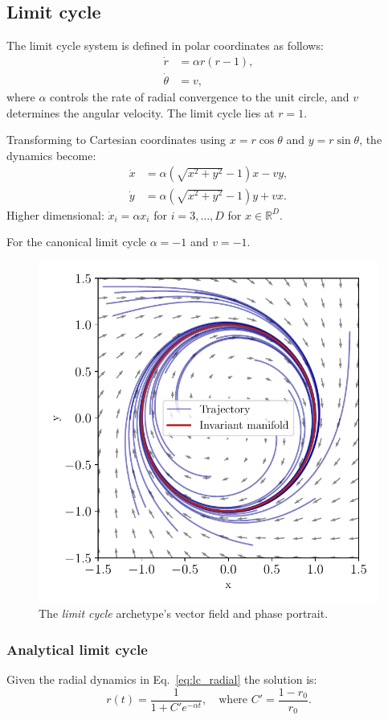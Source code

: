\documentclass{article}
\theoremstyle{definition} \newtheorem{definition}{Definition}  \newtheorem{example}{Example}
\theoremstyle{remark} \newtheorem{remark}{Remark}
\newcounter{ct}
\newcommand{\field}[1]{\ensuremath{\mathbb{#1}}}
\newcommand{\reals}{\field{R}}
\begin{document}
\subsection{Limit cycle}\label{sec:lc}
The limit cycle system is defined in polar coordinates as follows:
\begin{align}%
\dot{r} &= \alpha r(r - 1), \label{eq:lc_radial} \\
\dot{\theta} &= v, \label{eq:lc_angular} %
\end{align}
where \( \alpha \) controls the rate of radial convergence to the unit circle, and \( v \) determines the angular velocity.
The limit cycle lies at \( r = 1 \).

Transforming to Cartesian coordinates using \( x = r \cos\theta \) and \( y = r \sin\theta \), the dynamics become:
\[
\begin{aligned}
\dot{x} &= \alpha \left( \sqrt{x^2 + y^2} - 1 \right) x - v y, \\
\dot{y} &= \alpha \left( \sqrt{x^2 + y^2} - 1 \right) y + v x.
\end{aligned}
\]
Higher dimensional: $\dot x_i = \alpha x_i$ for $i=3, \dots, D$ for $x\in \reals^D$.

For the canonical limit cycle  $\alpha=-1$ and $v=-1$.

\begin{figure}[htbp]
    \centering
    \includegraphics[width=.5\linewidth]{lc_2d}
    \caption{The \emph{limit cycle} archetype's vector field and phase portrait.
     }
    \label{fig:lc_2d}
\end{figure}

%
\subsubsection{Analytical limit cycle}\label{sec:analytical_lc}
Given the radial dynamics in Eq.~\ref{eq:lc_radial} the solution is:
\[
r(t) = \frac{1}{1 + C' e^{-\alpha t}}, \quad \text{where } C' = \frac{1 - r_0}{r_0}.
\]
\end{document}
